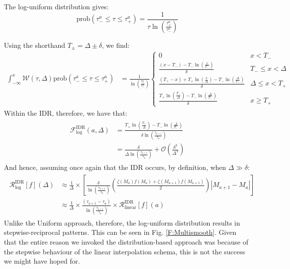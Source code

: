\documentclass[a4paper,11pt]{article}
\begin{document}
\begin{aside}
					The log-uniform distribution gives:
					\begin{equation}
						\text{prob}(\tau_-^a \leq \tau \leq \tau_+^a) = \frac{1}{\tau \ln\left(\frac{\tau_+^a}{\tau_-^a}\right)} 
					\end{equation} 

					Using the shorthand $T_\pm = \Delta \pm \delta$, we find:
					\begin{align}
						\int_{-\infty}^x \mathcal{W}(\tau,\Delta) \text{prob}(\tau_-^a \leq \tau \leq \tau_+^a)  
						& = \frac{1}{ \ln\left(\frac{\tau_+^a}{\tau_-^a}\right)}\begin{cases} 0 & x < T_-
							\\
							\frac{(x - T_-) - T_-\ln\left(\frac{x}{T_-}\right)}{\delta} & T_- \leq x  < \Delta
							\\
							\frac{(T_+ - x) + T_+ \ln\left(\frac{x}{\Delta}\right) - T_- \ln\left(\frac{\Delta}{T_-}\right)}{\delta} & \Delta \leq x < T_+
							\\
							\frac{T_+ \ln\left(\frac{T_+}{\Delta}\right) - T_- \ln\left(\frac{\Delta}{T_-}\right)}{\delta} & x \geq T_+
						\end{cases}
					\end{align}
					Within the IDR, therefore, we have that:
					\begin{align}
						\begin{split}
							\mathcal{F}_\text{log}^\text{IDR}(a,\Delta) & =\frac{T_+ \ln\left(\frac{T_+}{\Delta}\right) - T_- \ln\left(\frac{\Delta}{T_-}\right)}{\delta \ln\left(\frac{\tau_{a+1}}{\tau_a}\right)}
							\\
							&= \frac{\delta}{\Delta \ln\left(\frac{\tau_{a+1}}{\tau_a}\right)} + \mathcal{O}\left(\frac{\delta^3}{\Delta^3}\right)
						\end{split}
					\end{align}
					And hence, assuming once again that the IDR occurs, by definition, when $\Delta \gg \delta$:
					\begin{align}
						\begin{split}
						\mathcal{R}^\text{IDR}_\text{log}[f](\Delta) &\approx  \frac{1}{\Delta} \times \left[\frac{\delta}{\ln\left(\frac{\tau_{a+1}}{\tau_a}\right)} \left(\frac{\zeta(M_a) f(M_a) + \zeta(M_{a+1}) f(M_{a+1})}{2}\right)\left|M_{a+1} - M_a\right|\right]
						\\
						& \approx \frac{1}{\Delta} \times \frac{(\tau_{a+1} - \tau_a)}{\ln\left(\frac{\tau_{a+1}}{\tau_a}\right)} \times \mathcal{R}^\text{IDR}_\text{linear}[f](a)
						\end{split}
					\end{align}
					Unlike the Uniform approach, therefore, the log-uniform distribution results in stepwise-reciprocal patterns. This can be seen in Fig. \ref{F:Multismooth}. Given that the entire reason we invoked the distribution-based approach was because of the stepwise behaviour of the linear interpolation schema, this is not the success we might have hoped for. 


\end{aside}
\end{document}
